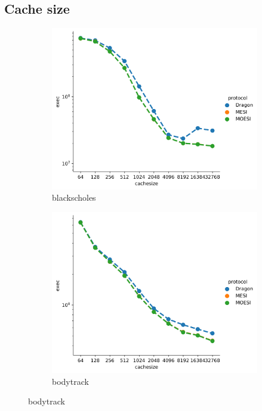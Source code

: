 \documentclass[nonacm,acmsmall,screen,11pt]{acmart}
\begin{document}
\subsection{Cache size}
\begin{figure}[htb!]
  \centering
  \begin{subfigure}{0.32\textwidth}
    \includegraphics[width=\textwidth]{cachesize-blackscholes}
    \caption{blackscholes}
  \end{subfigure}
  \begin{subfigure}{0.32\textwidth}
    \includegraphics[width=\columnwidth]{cachesize-bodytrack}
    \caption{bodytrack}
  \end{subfigure}

\end{figure}
\end{document}
